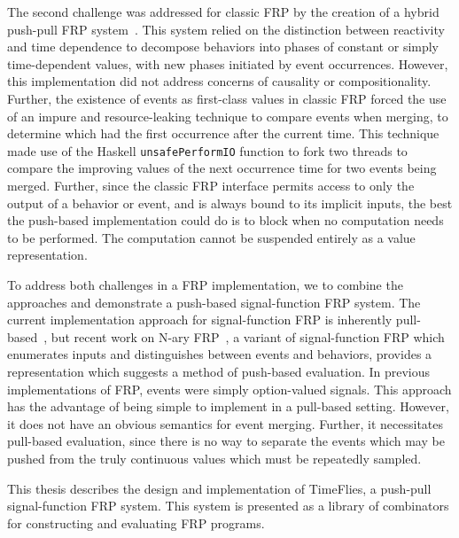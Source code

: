The second challenge was addressed for classic FRP by the creation of a hybrid
push-pull FRP system~\cite{Elliott2009}. This system relied on the distinction
between reactivity and time dependence to decompose behaviors into phases of
constant or simply time-dependent values, with new phases initiated by event
occurrences. However, this implementation did not address concerns of causality
or compositionality. Further, the existence of events as first-class values in
classic FRP forced the use of an impure and resource-leaking technique to
compare events when merging, to determine which had the first occurrence after
the current time. This technique made use of the Haskell {\tt unsafePerformIO}
function to fork two threads to compare the improving values of the next
occurrence time for two events being merged. Further, since the classic FRP
interface permits access to only the output of a behavior or event, and is
always bound to its implicit inputs, the best the push-based implementation
could do is to block when no computation needs to be performed. The computation
cannot be suspended entirely as a value representation.

To address both challenges in a FRP implementation, we to combine the approaches
and demonstrate a push-based signal-function FRP system. The current
implementation approach for signal-function FRP is inherently
pull-based~\cite{Nilsson2002}, but recent work on N-ary
FRP~\cite{Sculthorpe2011}, a variant of signal-function FRP which enumerates
inputs and distinguishes between events and behaviors, provides a representation
which suggests a method of push-based evaluation. In previous implementations of
FRP, events were simply option-valued signals. This approach has the advantage
of being simple to implement in a pull-based setting. However, it does not have
an obvious semantics for event merging. Further, it necessitates pull-based
evaluation, since there is no way to separate the events which may be pushed
from the truly continuous values which must be repeatedly sampled.

This thesis describes the design and implementation of TimeFlies, a push-pull signal-function FRP system. This system is presented as a library
of combinators for constructing and evaluating FRP programs.
